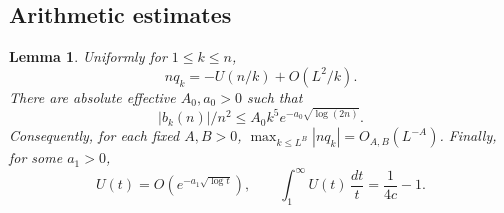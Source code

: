 \documentclass[11pt]{article}
\newtheorem{lemma}[theorem]{Lemma}
\theoremstyle{remark}\newtheorem{remark}[theorem]{Remark}
\begin{document}
\subsection{Arithmetic estimates}
\begin{lemma}\label{lem:arithmetic}
Uniformly for $1\le k\le n$,
\begin{equation}\label{eq:qprofile}
 nq_k=-U(n/k)+O(L^2/k).
\end{equation}
There are absolute effective $A_0,a_0>0$ such that
\begin{equation}\label{eq:small}
 |b_k(n)|/n^2\le A_0k^5e^{-a_0\sqrt{\log(2n)}}.
\end{equation}
Consequently, for each fixed $A,B>0$,
$\max_{k\le L^B}|nq_k|=O_{A,B}(L^{-A})$.
Finally, for some $a_1>0$,
\begin{equation}\label{eq:decay}
 U(t)=O(e^{-a_1\sqrt{\log t}}),\qquad
 \int_1^\infty U(t)\,\frac{dt}{t}=\frac1{4c}-1.
\end{equation}
\end{lemma}
\end{document}
